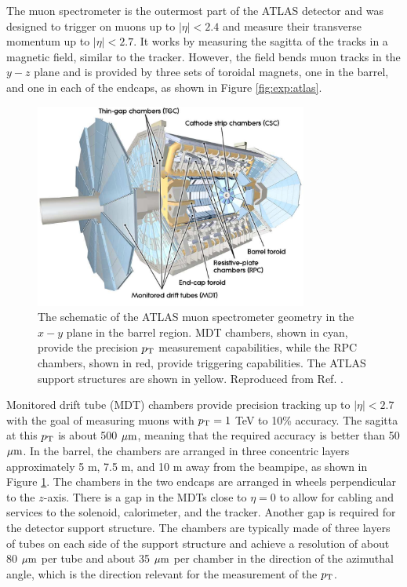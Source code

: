 The muon spectrometer is the outermost part of the ATLAS detector and was designed to
trigger on muons up to $|\eta| < 2.4$ and measure their transverse momentum up
to $|\eta| < 2.7$. It works by measuring the sagitta of the tracks
in a magnetic field, similar to the tracker. However, the field
bends muon tracks in the $y-z$ plane and is provided by three sets of
toroidal magnets, one in the barrel, and one in each of the endcaps,
as shown in Figure \ref{fig:exp:atlas}. 
\begin{figure}[h!]
  \centering
  \includegraphics[width=0.8\textwidth]{figures/experiment/muonspectrometer}
  \caption[The ATLAS muon spectrometer]{The schematic of the ATLAS muon
  spectrometer geometry in the $x-y$ plane in the barrel region. MDT
  chambers, shown in cyan, provide the precision $p_{\text{T}}$ measurement
  capabilities, while the RPC chambers, shown in red, provide triggering
  capabilities. The ATLAS support structures are shown in yellow.
  Reproduced from Ref. \cite{Aad:2010ag}.}
   \label{fig:exp:ms}
\end{figure}

Monitored drift tube (MDT) chambers provide precision tracking up to
$|\eta| < 2.7$ with the goal of measuring muons with $p_{\text{T}} = 1$ TeV
to 10\% accuracy. The sagitta at this $p_{\text{T}}$ is about 500 $\mu\text{m}$,
meaning that the required accuracy is better than 50 $\mu\text{m}$.
In the barrel, the chambers are arranged in three concentric
layers approximately 5 m, 7.5 m, and 10 m away from the beampipe, as
shown in Figure \ref{fig:exp:ms}. The chambers in the two endcaps are
arranged in wheels perpendicular to the $z$-axis. There is a gap in
the MDTs close to $\eta = 0$ to allow for cabling and services to
the solenoid, calorimeter, and the tracker. Another gap is required
for the detector support structure. The chambers are typically
made of three layers of tubes on each side of the support structure
and achieve a resolution of about 80 $\mu\text{m}$ per tube and about
35 $\mu\text{m}$ per chamber in the direction of the azimuthal angle, which is
the direction relevant for the measurement of the $p_{\text{T}}$.

